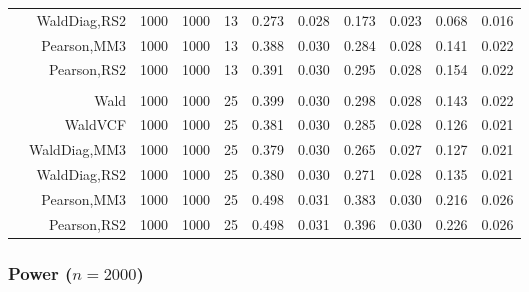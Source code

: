 \documentclass[
]{article}
\begin{document}
\begin{table}[H]
{\begin{tabular}[t]{lrrrrrrrlrr}
\hspace{1em} & WaldDiag,RS2 & 1000 & 1000 & 13 & 0.273 & 0.028 & 0.173 & 0.023 & 0.068 & 0.016\\

\hspace{1em} & Pearson,MM3 & 1000 & 1000 & 13 & 0.388 & 0.030 & 0.284 & 0.028 & 0.141 & 0.022\\

\hspace{1em} & Pearson,RS2 & 1000 & 1000 & 13 & 0.391 & 0.030 & 0.295 & 0.028 & 0.154 & 0.022\\
\cmidrule{1-11}
\addlinespace[0.3em]
\multicolumn{11}{l}{\textbf{3F 15V}}\\
\hspace{1em} & Wald & 1000 & 1000 & 25 & 0.399 & 0.030 & 0.298 & 0.028 & 0.143 & 0.022\\

\hspace{1em} & WaldVCF & 1000 & 1000 & 25 & 0.381 & 0.030 & 0.285 & 0.028 & 0.126 & 0.021\\

\hspace{1em} & WaldDiag,MM3 & 1000 & 1000 & 25 & 0.379 & 0.030 & 0.265 & 0.027 & 0.127 & 0.021\\

\hspace{1em} & WaldDiag,RS2 & 1000 & 1000 & 25 & 0.380 & 0.030 & 0.271 & 0.028 & 0.135 & 0.021\\

\hspace{1em} & Pearson,MM3 & 1000 & 1000 & 25 & 0.498 & 0.031 & 0.383 & 0.030 & 0.216 & 0.026\\

\hspace{1em} & Pearson,RS2 & 1000 & 1000 & 25 & 0.498 & 0.031 & 0.396 & 0.030 & 0.226 & 0.026\\
\bottomrule
\end{tabular}}
\endgroup{}
\end{table}

\hypertarget{power-n2000}{%
\subsubsection{\texorpdfstring{Power
(\(n=2000\))}{Power (n=2000)}}\label{power-n2000}}
\end{document}
